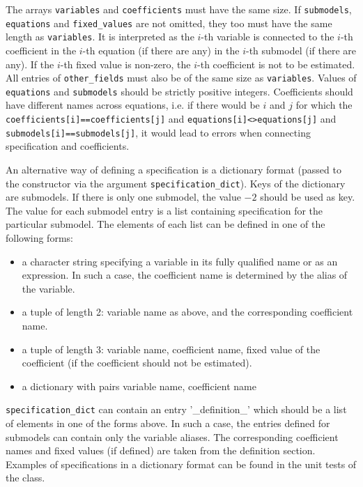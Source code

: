 The arrays \verb|variables| and \verb|coefficients| must have the same size.
If \verb|submodels|, \verb|equations| and \verb|fixed_values| are not omitted, they too must have
the same length as \verb|variables|. It is interpreted as the $i$-th variable
is connected to the $i$-th coefficient in the $i$-th equation (if there are
any) in the $i$-th submodel (if there are any). If the $i$-th fixed value is non-zero, the $i$-th coefficient
is not to be estimated. All entries of \verb|other_fields| must also be of the same size 
as \verb|variables|.
Values of \verb|equations| and
\verb|submodels| should be strictly positive integers. Coefficients should
have different names across equations, i.e. if there would be $i$ and $j$ for
which the \verb|coefficients[i]==coefficients[j]| and
\verb|equations[i]<>equations[j]| and \verb|submodels[i]==submodels[j]|, it
would lead to errors when connecting specification and coefficients.

An alternative way of defining a specification is a dictionary format (passed to the constructor via the argument 
\verb|specification_dict|).
Keys of the dictionary are submodels. If there
is only one submodel, the value $-2$ should be used as key. 
The value for each submodel entry is a list containing specification for the particular submodel.
The elements of each list can be defined in one of the following forms:
\begin{itemize}
\item a character string specifying a variable in its fully qualified name or as an expression. In such a case, 
      the coefficient name is determined by the alias of the variable.
\item a tuple of length 2: variable name as above, and the corresponding coefficient name.
\item a tuple of length 3: variable name, coefficient name, fixed value of the coefficient (if the 
                                coefficient should not be estimated).
\item a dictionary with pairs variable name, coefficient name
\end{itemize}
\verb|specification_dict| can contain an entry '_definition_' which should be a list of elements in one of the forms above.
In such a case, the entries defined for submodels can contain only the variable aliases. The corresponding 
coefficient names and fixed values (if defined) are taken from the definition section. Examples of specifications in 
a dictionary format can be found in the unit tests of the  class.


